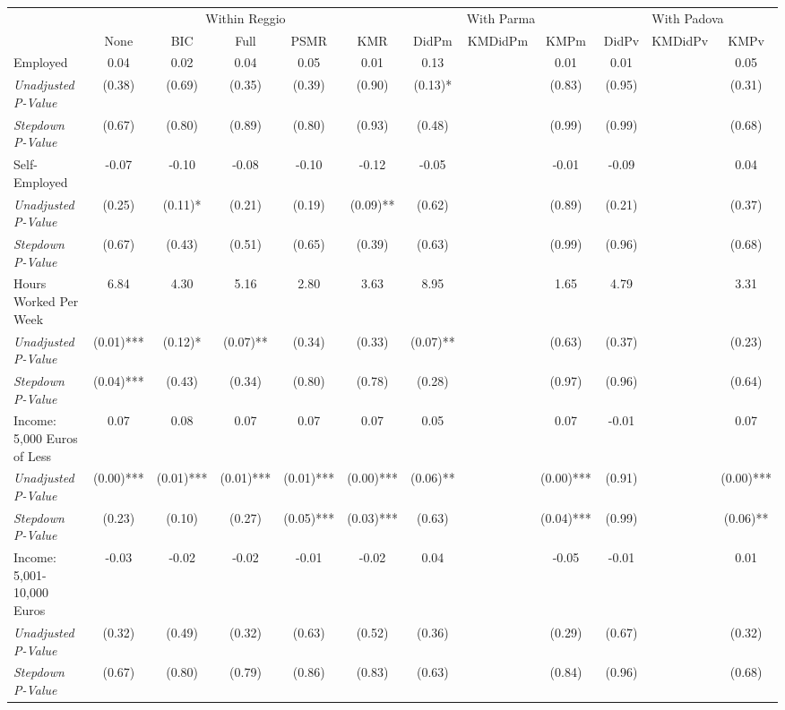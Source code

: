 \begin{tabular}{l c c c c c c c c c c c}
\toprule
& \multicolumn{5}{c}{Within Reggio} & \multicolumn{3}{c}{With Parma} & \multicolumn{3}{c}{With Padova} \\\cmidrule(lr){2-6} \cmidrule(lr){7-9} \cmidrule(lr){10-12}
 & None & BIC & Full & PSMR & KMR & DidPm & KMDidPm & KMPm & DidPv & KMDidPv & KMPv \\
\midrule
Employed & 0.04 & 0.02 & 0.04 & 0.05 & 0.01 & 0.13 & & 0.01 & 0.01 & & 0.05 \\
\quad \textit{Unadjusted P-Value} & (0.38) & (0.69) & (0.35) & (0.39) & (0.90) & (0.13)* & & (0.83) & (0.95) & & (0.31) \\
\quad \textit{Stepdown P-Value} & (0.67) & (0.80) & (0.89) & (0.80) & (0.93) & (0.48) & & (0.99) & (0.99) & & (0.68) \\
Self-Employed & -0.07 & -0.10 & -0.08 & -0.10 & -0.12 & -0.05 & & -0.01 & -0.09 & & 0.04 \\
\quad \textit{Unadjusted P-Value} & (0.25) & (0.11)* & (0.21) & (0.19) & (0.09)** & (0.62) & & (0.89) & (0.21) & & (0.37) \\
\quad \textit{Stepdown P-Value} & (0.67) & (0.43) & (0.51) & (0.65) & (0.39) & (0.63) & & (0.99) & (0.96) & & (0.68) \\
Hours Worked Per Week & 6.84 & 4.30 & 5.16 & 2.80 & 3.63 & 8.95 & & 1.65 & 4.79 & & 3.31 \\
\quad \textit{Unadjusted P-Value} & (0.01)*** & (0.12)* & (0.07)** & (0.34) & (0.33) & (0.07)** & & (0.63) & (0.37) & & (0.23) \\
\quad \textit{Stepdown P-Value} & (0.04)*** & (0.43) & (0.34) & (0.80) & (0.78) & (0.28) & & (0.97) & (0.96) & & (0.64) \\
Income: 5,000 Euros of Less & 0.07 & 0.08 & 0.07 & 0.07 & 0.07 & 0.05 & & 0.07 & -0.01 & & 0.07 \\
\quad \textit{Unadjusted P-Value} & (0.00)*** & (0.01)*** & (0.01)*** & (0.01)*** & (0.00)*** & (0.06)** & & (0.00)*** & (0.91) & & (0.00)*** \\
\quad \textit{Stepdown P-Value} & (0.23) & (0.10) & (0.27) & (0.05)*** & (0.03)*** & (0.63) & & (0.04)*** & (0.99) & & (0.06)** \\
Income: 5,001-10,000 Euros & -0.03 & -0.02 & -0.02 & -0.01 & -0.02 & 0.04 & & -0.05 & -0.01 & & 0.01 \\
\quad \textit{Unadjusted P-Value} & (0.32) & (0.49) & (0.32) & (0.63) & (0.52) & (0.36) & & (0.29) & (0.67) & & (0.32) \\
\quad \textit{Stepdown P-Value} & (0.67) & (0.80) & (0.79) & (0.86) & (0.83) & (0.63) & & (0.84) & (0.96) & & (0.68) \\

\end{tabular}
